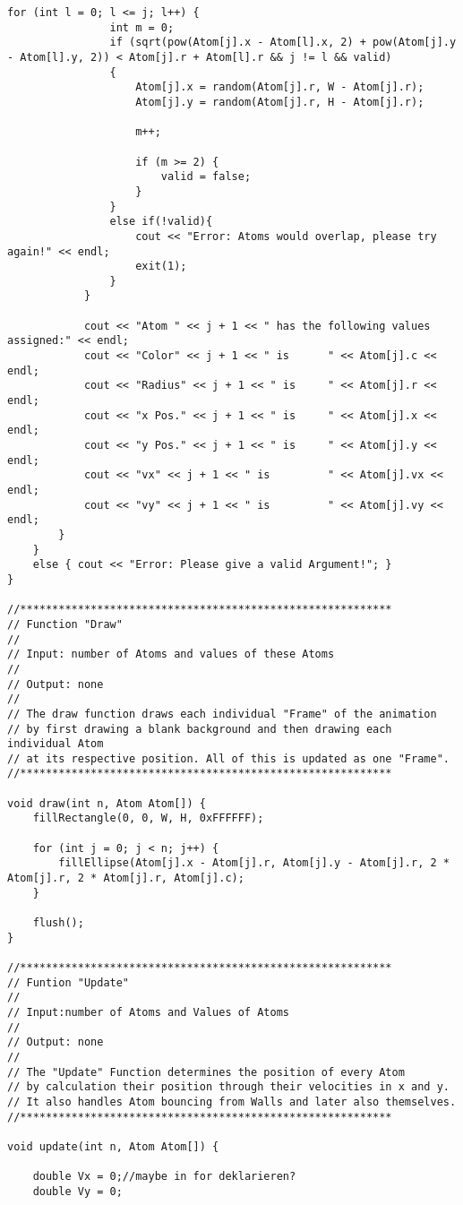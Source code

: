 \documentclass[11pt,titlepage]{article}
\begin{document}
\begin{lstlisting}[name=Main.cpp]
			for (int l = 0; l <= j; l++) {
				int m = 0;
				if (sqrt(pow(Atom[j].x - Atom[l].x, 2) + pow(Atom[j].y - Atom[l].y, 2)) < Atom[j].r + Atom[l].r && j != l && valid)
				{
					Atom[j].x = random(Atom[j].r, W - Atom[j].r);
					Atom[j].y = random(Atom[j].r, H - Atom[j].r);
					
					m++;
					
					if (m >= 2) {
						valid = false;
					}
				}
				else if(!valid){
					cout << "Error: Atoms would overlap, please try again!" << endl;
					exit(1);
				}
			}
			
			cout << "Atom " << j + 1 << " has the following values assigned:" << endl;
			cout << "Color" << j + 1 << " is      " << Atom[j].c << endl;
			cout << "Radius" << j + 1 << " is     " << Atom[j].r << endl;
			cout << "x Pos." << j + 1 << " is     " << Atom[j].x << endl;
			cout << "y Pos." << j + 1 << " is     " << Atom[j].y << endl;
			cout << "vx" << j + 1 << " is         " << Atom[j].vx << endl;
			cout << "vy" << j + 1 << " is         " << Atom[j].vy << endl;
		}
	}
	else { cout << "Error: Please give a valid Argument!"; }
}

//**********************************************************
// Function "Draw"
// 
// Input: number of Atoms and values of these Atoms
// 
// Output: none
// 
// The draw function draws each individual "Frame" of the animation
// by first drawing a blank background and then drawing each individual Atom
// at its respective position. All of this is updated as one "Frame". 
//**********************************************************

void draw(int n, Atom Atom[]) {
	fillRectangle(0, 0, W, H, 0xFFFFFF);
	
	for (int j = 0; j < n; j++) {
		fillEllipse(Atom[j].x - Atom[j].r, Atom[j].y - Atom[j].r, 2 * Atom[j].r, 2 * Atom[j].r, Atom[j].c);
	}
	
	flush();
}

//**********************************************************
// Funtion "Update"
// 
// Input:number of Atoms and Values of Atoms
// 
// Output: none
// 
// The "Update" Function determines the position of every Atom
// by calculation their position through their velocities in x and y.
// It also handles Atom bouncing from Walls and later also themselves.
//**********************************************************

void update(int n, Atom Atom[]) {
	
	double Vx = 0;//maybe in for deklarieren?
	double Vy = 0;
	

\end{lstlisting}
\end{document}

